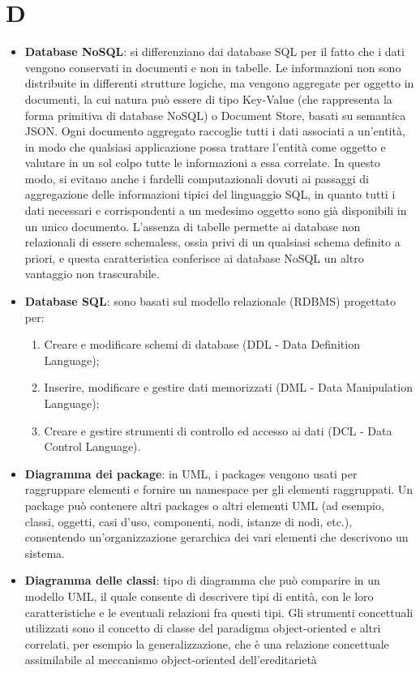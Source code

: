 \newpage
\section{D}

\begin{itemize}
	\item \textbf{Database NoSQL}: si differenziano dai database SQL per il fatto che i dati vengono conservati in documenti e non in tabelle. Le informazioni non sono distribuite in differenti strutture logiche, ma vengono aggregate per oggetto in documenti, la cui natura può essere di tipo Key-Value (che rappresenta la forma primitiva di database NoSQL) o Document Store, basati su semantica JSON. Ogni documento aggregato raccoglie tutti i dati associati a un’entità, in modo che qualsiasi applicazione possa trattare l’entità come oggetto e valutare in un sol colpo tutte le informazioni a essa correlate. In questo modo, si evitano anche i fardelli computazionali dovuti ai passaggi di aggregazione delle informazioni tipici del linguaggio SQL, in quanto tutti i dati necessari e corrispondenti a un medesimo oggetto sono già disponibili in un unico documento. L’assenza di tabelle permette ai database non relazionali di essere schemaless, ossia privi di un qualsiasi schema definito a priori, e questa caratteristica conferisce ai database NoSQL un altro vantaggio non trascurabile.
	\item \textbf{Database SQL}: sono basati sul modello relazionale (RDBMS) progettato per:
	\begin{enumerate}  
		\item Creare e modificare schemi di database (DDL - Data Definition Language);
		\item Inserire, modificare e gestire dati memorizzati (DML - Data Manipulation Language);
		\item Creare e gestire strumenti di controllo ed accesso ai dati (DCL - Data Control Language).
	\end{enumerate}
	\item \textbf{Diagramma dei package}: in UML, i packages vengono usati per raggruppare elementi e fornire un namespace per gli elementi raggruppati. Un package può contenere altri packages o altri elementi UML (ad esempio, classi, oggetti, casi d'uso, componenti, nodi, istanze di nodi, etc.), consentendo un'organizzazione gerarchica dei vari elementi che descrivono un sistema.
	\item \textbf{Diagramma delle classi}: tipo di diagramma che può comparire in un modello UML, il quale consente di descrivere tipi di entità, con le loro caratteristiche e le eventuali relazioni fra questi tipi. Gli strumenti concettuali utilizzati sono il concetto di classe del paradigma object-oriented e altri correlati, per esempio la generalizzazione, che è una relazione concettuale assimilabile al meccanismo object-oriented dell'ereditarietà

\end{itemize}
